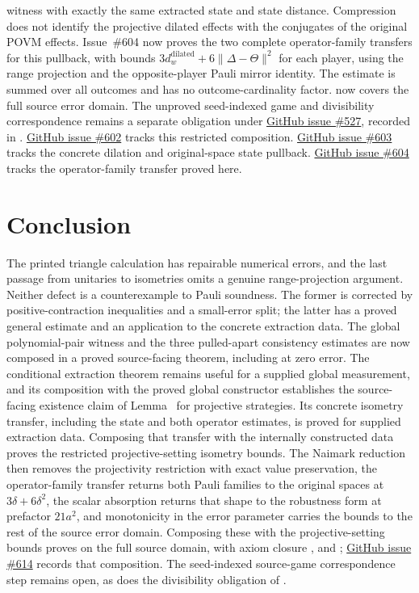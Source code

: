 \documentclass[11pt]{article}
\renewcommand{\ghissue}[1]{%
  \href{https://github.com/Dengnifer/MIPStarRE-QPBT/issues/#1}{GitHub issue \##1}}
\begin{document}
witness with exactly the same extracted state and state distance. Compression
does not identify the projective dilated effects with the conjugates of the
original POVM effects. Issue~\#604 now proves the two complete
operator-family transfers for this pullback, with bounds
\(3d_w^{\mathrm{dilated}}+6\|\Delta-\Theta\|^2\) for each player, using the
range projection and the opposite-player Pauli mirror identity. The estimate
is summed over all outcomes and has no outcome-cardinality factor.
 now covers the full source error domain. The unproved
seed-indexed game and divisibility correspondence remains a separate obligation
under \ghissue{527}, recorded in
.
\ghissue{602} tracks this restricted composition.
\ghissue{603} tracks the concrete dilation and original-space state pullback.
\ghissue{604} tracks the operator-family transfer proved here.

\section{Conclusion}

The printed triangle calculation has repairable numerical errors, and the
last passage from unitaries to isometries omits a genuine range-projection
argument.  Neither defect is a counterexample to Pauli soundness.  The former
is corrected by positive-contraction inequalities and a small-error split;
the latter has a proved general estimate and an application to the concrete
extraction data. The global polynomial-pair witness
and the three pulled-apart consistency estimates are now composed in a proved
source-facing theorem, including at zero error. The conditional extraction
theorem remains useful for a supplied global measurement, and its composition
with the proved global constructor establishes the source-facing existence
claim of Lemma~ for projective strategies. Its concrete
isometry transfer, including the state and both operator estimates, is proved
for supplied extraction data. Composing that transfer with the internally
constructed data proves the restricted projective-setting isometry bounds.
The Naimark reduction then removes the projectivity restriction with exact
value preservation, the operator-family transfer returns both Pauli families
to the original spaces at $3\delta + 6\delta^2$, the scalar absorption returns
that shape to the robustness form at prefactor $21a^2$, and monotonicity in
the error parameter carries the bounds to the rest of the source error
domain.  Composing these with the projective-setting bounds proves
 on the full source domain, with axiom closure
,  and ;
\ghissue{614} records that composition.  The seed-indexed source-game
correspondence step remains open, as does the divisibility obligation of
.



\end{document}
